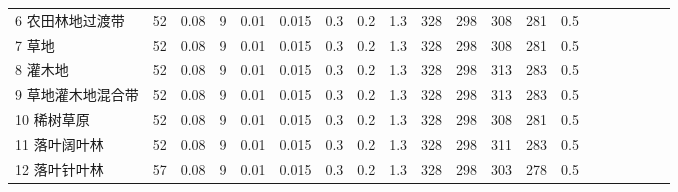 \begin{landscape}
\begin{table}[htbp]
\begin{tabular}{@{}lccccccccccccccccccc@{}}
      6 农田林地过渡带          & 52                   & 0.08     & 9   & 0.01 & 0.015               & 0.3   & 0.2   & 1.3   & 328               & 298               & 308                 & 281                & 0.5                \\
      7 草地                    & 52                   & 0.08     & 9   & 0.01 & 0.015               & 0.3   & 0.2   & 1.3   & 328               & 298               & 308                 & 281                & 0.5                \\
      8 灌木地                  & 52                   & 0.08     & 9   & 0.01 & 0.015               & 0.3   & 0.2   & 1.3   & 328               & 298               & 313                 & 283                & 0.5                \\
      9 草地灌木地混合带        & 52                   & 0.08     & 9   & 0.01 & 0.015               & 0.3   & 0.2   & 1.3   & 328               & 298               & 313                 & 283                & 0.5                \\
      10 稀树草原               & 52                   & 0.08     & 9   & 0.01 & 0.015               & 0.3   & 0.2   & 1.3   & 328               & 298               & 308                 & 281                & 0.5                \\
      11 落叶阔叶林             & 52                   & 0.08     & 9   & 0.01 & 0.015               & 0.3   & 0.2   & 1.3   & 328               & 298               & 311                 & 283                & 0.5                \\
      12 落叶针叶林             & 57                   & 0.08     & 9   & 0.01 & 0.015               & 0.3   & 0.2   & 1.3   & 328               & 298               & 303                 & 278                & 0.5                \\ %
%

\end{tabular}
\end{table}
\end{landscape}
